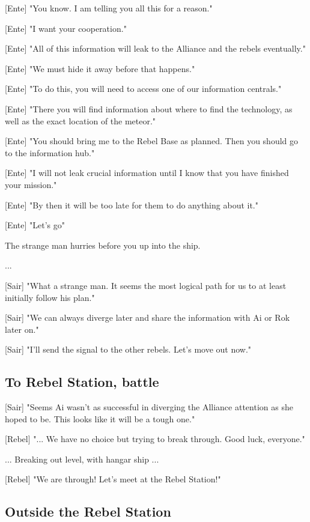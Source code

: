 \documentclass[a4paper,12pt]{article}
\begin{document}
[Ente] "You know. I am telling you all this for a reason." 

[Ente] "I want your cooperation." 

[Ente] "All of this information will leak to the Alliance and the rebels eventually." 

[Ente] "We must hide it away before that happens."

[Ente] "To do this, you will need to access one of our information centrals." 

[Ente] "There you will find information about where to find the technology, as well as the exact location of the meteor."

[Ente] "You should bring me to the Rebel Base as planned. Then you should go to the information hub."

[Ente] "I will not leak crucial information until I know that you have finished your mission."

[Ente] "By then it will be too late for them to do anything about it."

[Ente] "Let's go"

The strange man hurries before you up into the ship.

...

[Sair] "What a strange man. It seems the most logical path for us to at least initially follow his plan."

[Sair] "We can always diverge later and share the information with Ai or Rok later on."

[Sair] "I'll send the signal to the other rebels. Let's move out now."

\subsection{To Rebel Station, battle}

[Sair] "Seems Ai wasn't as successful in diverging the Alliance attention as she hoped to be. This looks like it will be a tough one."

[Rebel] "... We have no choice but trying to break through. Good luck, everyone."

... Breaking out level, with hangar ship ...

[Rebel] "We are through! Let's meet at the Rebel Station!"

\subsection{Outside the Rebel Station}
\end{document}
